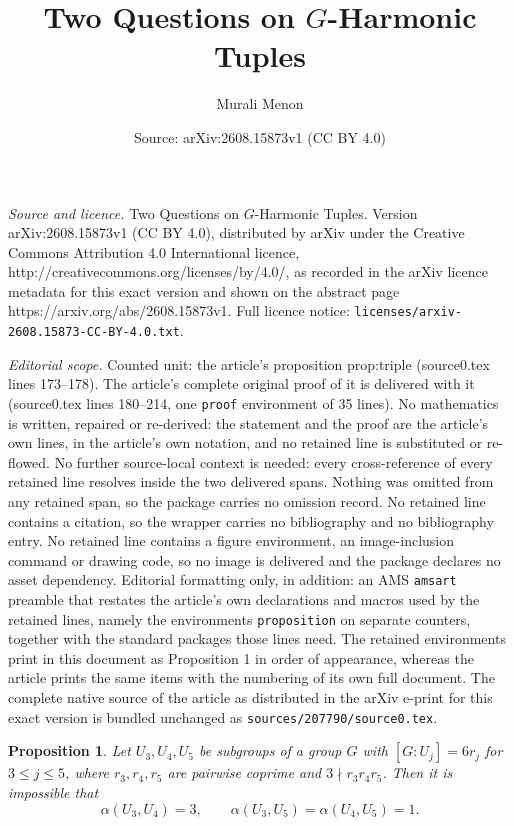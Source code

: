 \documentclass[10pt,a4paper]{amsart}
\title{Two Questions on $G$-Harmonic Tuples}
\author{Murali Menon}
\date{Source: arXiv:2608.15873v1 (CC BY 4.0)}
\newtheorem{proposition}{Proposition}
\begin{document}
\maketitle

\noindent\emph{Source and licence.} Two Questions on $G$-Harmonic Tuples. Version arXiv:2608.15873v1 (CC BY 4.0), distributed by arXiv under the Creative Commons Attribution 4.0 International licence, http://creativecommons.org/licenses/by/4.0/, as recorded in the arXiv licence metadata for this exact version and shown on the abstract page https://arxiv.org/abs/2608.15873v1. Full licence notice: \texttt{licenses/arxiv-2608.15873-CC-BY-4.0.txt}.\par\smallskip

\noindent\textit{Editorial scope.} Counted unit: the article's proposition prop:triple (source0.tex lines 173--178). The article's complete original proof of it is delivered with it (source0.tex lines 180--214, one \texttt{proof} environment of 35 lines). No mathematics is written, repaired or re-derived: the statement and the proof are the article's own lines, in the article's own notation, and no retained line is substituted or re-flowed.  No further source-local context is needed: every cross-reference of every retained line resolves inside the two delivered spans.  Nothing was omitted from any retained span, so the package carries no omission record.  No retained line contains a citation, so the wrapper carries no bibliography and no bibliography entry.  No retained line contains a figure environment, an image-inclusion command or drawing code, so no image is delivered and the package declares no asset dependency.  Editorial formatting only, in addition: an AMS \texttt{amsart} preamble that restates the article's own declarations and macros used by the retained lines, namely the environments \texttt{proposition} on separate counters, together with the standard packages those lines need.  The retained environments print in this document as Proposition 1 in order of appearance, whereas the article prints the same items with the numbering of its own full document.  The complete native source of the article as distributed in the arXiv e-print for this exact version is bundled unchanged as \texttt{sources/207790/source0.tex}.
\begin{proposition}\label{prop:triple}
Let $U_3,U_4,U_5$ be subgroups of a group $G$ with $[G:U_j]=6r_j$ for $3\le j\le 5$, where $r_3,r_4,r_5$ are pairwise coprime and $3\nmid r_3r_4r_5$. Then it is impossible that
\[
\alpha(U_3,U_4)=3,\qquad \alpha(U_3,U_5)=\alpha(U_4,U_5)=1.
\]
\end{proposition}
\end{document}
